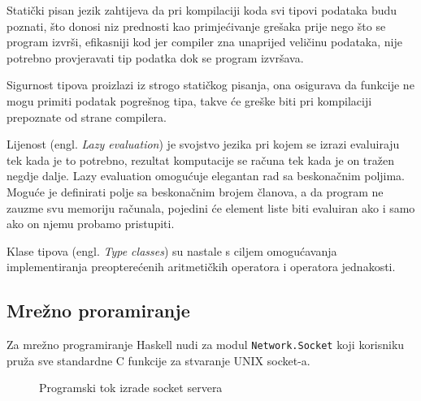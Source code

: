 Statički pisan jezik zahtijeva da pri kompilaciji koda svi tipovi podataka budu
poznati, što donosi niz prednosti kao primjećivanje grešaka prije nego što se
program izvrši, efikasniji kod jer compiler zna unaprijed veličinu podataka,
nije potrebno provjeravati tip podatka dok se program izvršava.

Sigurnost tipova proizlazi iz strogo statičkog pisanja, ona osigurava da
funkcije ne mogu primiti podatak pogrešnog tipa, takve će greške biti pri
kompilaciji prepoznate od strane compilera.

Lijenost (engl. \emph{Lazy evaluation}) je svojstvo jezika pri kojem se izrazi
evaluiraju tek kada je to potrebno, rezultat komputacije se računa tek kada je
on tražen negdje dalje. Lazy evaluation omogućuje elegantan rad sa beskonačnim
poljima. Moguće je definirati polje sa beskonačnim brojem članova, a da program
ne zauzme svu memoriju računala, pojedini će element liste biti evaluiran ako i
samo ako on njemu probamo pristupiti.

Klase tipova (engl. \emph{Type classes}) su nastale s ciljem omogućavanja
implementiranja preopterećenih aritmetičkih operatora i operatora jednakosti.

\subsection{Mrežno proramiranje}
\label{subsect:haskell_net}

Za mrežno programiranje Haskell nudi za modul
\texttt{Network.Socket} \cite{network_socket} koji korisniku
pruža sve standardne C funkcije za stvaranje UNIX socket-a.

\begin{figure}[H]
\centering
{}
\caption{Programski tok izrade socket servera}
\label{fig:server_creation}
\end{figure}

